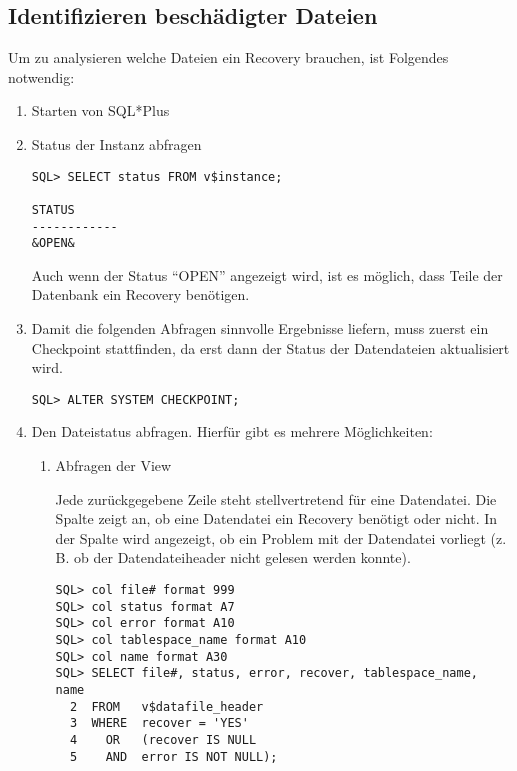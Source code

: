       \subsection{Identifizieren besch\"adigter Dateien}
        \label{identifyfiles}
        Um zu analysieren welche Dateien ein Recovery brauchen, ist Folgendes notwendig:
        \begin{enumerate}
          \item Starten von SQL*Plus
          \item Status der Instanz abfragen
          \begin{lstlisting}[caption={Status der Instanz abfragen},label=admin1434,language=oracle_sql]
SQL> SELECT status FROM v$instance;

STATUS
------------
&OPEN&
          \end{lstlisting}
          Auch wenn der Status \enquote{OPEN} angezeigt wird, ist es m\"oglich,
          dass Teile der Datenbank ein Recovery ben\"otigen.
          \item Damit die folgenden Abfragen sinnvolle Ergebnisse liefern, muss zuerst ein Checkpoint stattfinden, da erst dann der Status der Datendateien aktualisiert wird.
          \begin{lstlisting}[caption={Einen Checkpoint absetzen},label=admin1435,language=oracle_sql]
SQL> ALTER SYSTEM CHECKPOINT;
          \end{lstlisting}
          \item Den Dateistatus abfragen. Hierf\"ur gibt es mehrere M\"og\-lich\-kei\-ten:
          \begin{enumerate}
            \item Abfragen der View 

						Jede zur\"uckgegebene Zeile steht stellvertretend f\"ur eine Datendatei. Die Spalte  zeigt an, ob eine Datendatei ein Recovery ben\"otigt oder nicht. In der Spalte  wird angezeigt, ob ein Problem mit der Datendatei vorliegt (z. B. ob der Datendateiheader nicht gelesen werden konnte).
						\begin{lstlisting}[caption={Status der Datendateien abfragen mit	V\$DATAFILE\_HEADER},label=admin1436,language=oracle_sql,alsolanguage=sqlplus,emph={[9]FILE,OFFLINE,TABLESPACE, NOT},emphstyle={[9]\color{black}}]
SQL> col file# format 999
SQL> col status format A7
SQL> col error format A10
SQL> col tablespace_name format A10
SQL> col name format A30
SQL> SELECT file#, status, error, recover, tablespace_name, name
  2  FROM   v$datafile_header
  3  WHERE  recover = 'YES'
  4    OR   (recover IS NULL
  5    AND  error IS NOT NULL);


\end{lstlisting}
\end{enumerate}
\end{enumerate}
